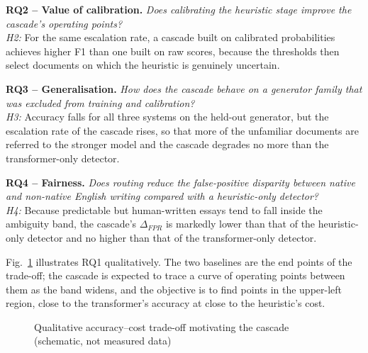 \textbf{RQ2 -- Value of calibration.} \emph{Does calibrating the heuristic
stage improve the cascade's operating points?}\\
\textit{H2:} For the same escalation rate, a cascade built on calibrated
probabilities achieves higher F1 than one built on raw scores, because the
thresholds then select documents on which the heuristic is genuinely
uncertain.

\textbf{RQ3 -- Generalisation.} \emph{How does the cascade behave on a
generator family that was excluded from training and calibration?}\\
\textit{H3:} Accuracy falls for all three systems on the held-out generator,
but the escalation rate of the cascade rises, so that more of the unfamiliar
documents are referred to the stronger model and the cascade degrades no more
than the transformer-only detector.

\textbf{RQ4 -- Fairness.} \emph{Does routing reduce the false-positive
disparity between native and non-native English writing compared with a
heuristic-only detector?}\\
\textit{H4:} Because predictable but human-written essays tend to fall inside
the ambiguity band, the cascade's $\Delta_{FPR}$ is markedly lower than that of
the heuristic-only detector and no higher than that of the transformer-only
detector.

Fig.~\ref{fig:tradeoff} illustrates RQ1 qualitatively. The two baselines are
the end points of the trade-off; the cascade is expected to trace a curve of
operating points between them as the band widens, and the objective is to
find points in the upper-left region, close to the transformer's accuracy at
close to the heuristic's cost.

\begin{figure}[H]
\centering
{}
\caption{Qualitative accuracy--cost trade-off motivating the cascade (schematic, not measured data)}
\label{fig:tradeoff}
\end{figure}

